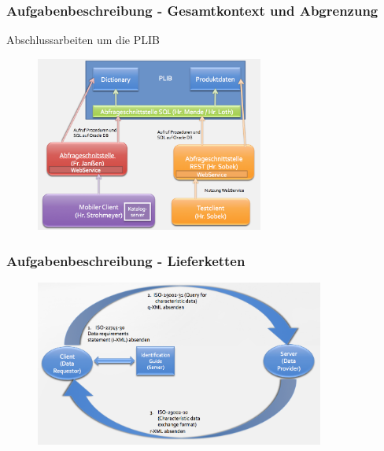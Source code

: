 \documentclass[serif,mathserif]{beamer}
\begin{document}
\begin{frame}
  \frametitle{Aufgabenbeschreibung - Gesamtkontext und Abgrenzung}
    Abschlussarbeiten um die PLIB
  \begin{figure}[t]
    \includegraphics[width=7.5cm]{images/gesamtkontext_plib.png}
  \end{figure}
\end{frame}

\begin{frame}
  \frametitle{Aufgabenbeschreibung - Lieferketten}

  \begin{figure}[t]
    \includegraphics[width=9.5cm]{images/lieferketten_plib.png}
  \end{figure}
\end{frame}

\end{document}
